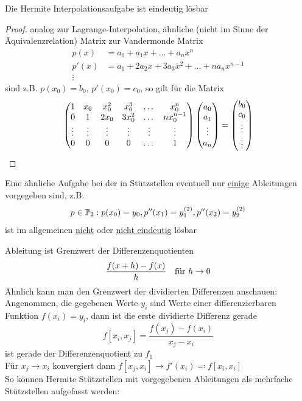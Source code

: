 \begin{theorem}
    Die Hermite Interpolationsaufgabe ist eindeutig lösbar
\end{theorem}
\begin{proof}
    analog zur Lagrange-Interpolation, ähnliche (nicht im Sinne der Äquivalenzrelation) Matrix zur Vandermonde Matrix
    \begin{align*}
        p(x) &= a_0 + a_1x + \dots + a_nx^n\\
        p'(x) &= a_1+2a_2x+3a_3x^2+\dots+na_nx^{n-1}\\
        \vdots
    \end{align*}
    sind z.B. $p(x_0) = b_0$, $p'(x_0)=c_0$, so gilt für die Matrix \[
        \begin{pmatrix}
            1&x_0&x_0^2&x_0^3&\dots&x_0^n \\
            0&1&2x_0&3x_0^2&\dots&nx_0^{n-1}\\
            \vdots&\vdots&\vdots&\vdots & \vdots&\vdots\\
            0&0&0&0&\dots& 1
        \end{pmatrix}\begin{pmatrix}
        a_0\\a_1\\ \vdots\\a_n
        \end{pmatrix}
        = \begin{pmatrix}b_0\\c_0\\\vdots\\\vdots\end{pmatrix}
    \]
\end{proof}
\begin{remark}
    Eine ähnliche Aufgabe bei der in Stützstellen eventuell nur \underline{einige} Ableitungen vorgegeben sind, z.B. \[
    p\in\mathbb{P}_2: p(x_0) = y_0, p''(x_1) = y_1^{(2)}, p''(x_2)=y_2^{(2)}
    \] 
    ist im allgemeinen \underline{nicht} oder \underline{nicht eindeutig} lösbar
\end{remark}
 Ableitung ist Grenzwert der Differenzenquotienten \[
    \frac{f(x+h) - f(x)}{h} \hspace{1em} \text{für }h\to 0
 \]
Ähnlich kann man den Grenzwert der dividierten Differenzen anschauen:\\
Angenommen, die gegebenen Werte $y_i$ sind Werte einer differenzierbaren Funktion $f(x_i) = y_i$, dann ist die erste 
dividierte Differenz gerade \[
    f[x_i, x_j] = \frac{f(x_j) - f(x_i)}{x_j-x_i} 
\]
ist gerade der Differenzenquotient zu $f_1$\\
Für $x_j\to x_i$ konvergiert dann $f[x_j,x_i]\to f'(x_i)\eqqcolon f[x_i,x_i]$\\
So können Hermite Stützstellen mit vorgegebenen Ableitungen als mehrfache Stützstellen aufgefasst werden:\\
